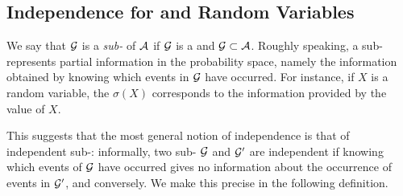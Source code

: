 \documentclass[../Main.tex]{subfiles}
\begin{document}


\subsection{Independence for \sfields and Random Variables}
We say that $\mathcal{G}$ is a \emph{sub-\sfield} of $\mathcal{A}$ if
$\mathcal{G}$ is a \sfield and $\mathcal{G}\subset\mathcal{A}$.
Roughly speaking, a sub-\sfield represents partial information in the
probability space, namely the information obtained by knowing which events in
$\mathcal{G}$ have occurred. For instance, if $X$ is a random variable, the
\sfield $\sigma(X)$ corresponds to the information provided by the value
of $X$.

This suggests that the most general notion of independence is that of
independent sub-\sfields: informally, two sub-\sfields
$\mathcal{G}$ and $\mathcal{G}'$ are independent if knowing which events of
$\mathcal{G}$ have occurred gives no information about the occurrence of events
in $\mathcal{G}'$, and conversely. We make this precise in the following
definition.
\end{document}
